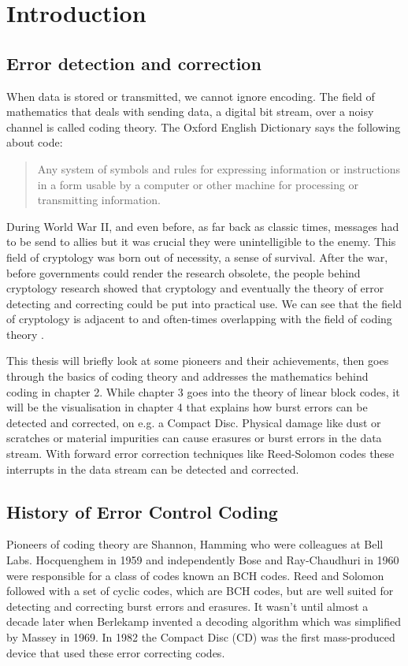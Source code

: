 \documentclass[../main.tex]{subfiles}
\begin{document}
    \chapter{Introduction}

    \section{Error detection and correction}
    When data is stored or transmitted, we cannot ignore encoding. The field of mathematics that deals with sending data, a digital bit stream, over a noisy channel is called coding theory. The Oxford English Dictionary says the following about code:

    \begin{quote}
        Any system of symbols and rules for expressing information or instructions in a form usable by a computer or other machine for processing or transmitting information.
    \end{quote}

    During World War II, and even before, as far back as classic times, messages had to be send to allies but it was crucial they were unintelligible to the enemy. This field of cryptology was born out of necessity, a sense of survival. After the war, before governments could render the research obsolete, the people behind cryptology research showed that cryptology and eventually the theory of error detecting and correcting could be put into practical use. We can see that the field of cryptology is adjacent to and often-times overlapping with the field of coding theory \autocite{trappe2006introduction}.

    This thesis will briefly look at some pioneers and their achievements, then goes through the basics of coding theory and addresses the mathematics behind coding in chapter 2. While chapter 3 goes into the theory of linear block codes, it will be the visualisation in chapter 4 that explains how burst errors can be detected and corrected, on e.g. a Compact Disc. Physical damage like dust or scratches or material impurities can cause erasures or burst errors in the data stream. With forward error correction techniques like Reed-Solomon codes these interrupts in the data stream can be detected and corrected.


    \section{History of Error Control Coding}
    Pioneers of coding theory are Shannon, Hamming who were colleagues at Bell Labs. Hocquenghem in 1959 and independently Bose and Ray-Chaudhuri in 1960 were responsible for a class of codes known an BCH codes. Reed and Solomon followed with a set of cyclic codes, which are BCH codes, but are well suited for detecting and correcting burst errors and erasures. It wasn't until almost a decade later when Berlekamp invented a decoding algorithm which was simplified by Massey in 1969. In 1982 the Compact Disc (CD) was the first mass-produced device that used these error correcting codes.
\end{document}
